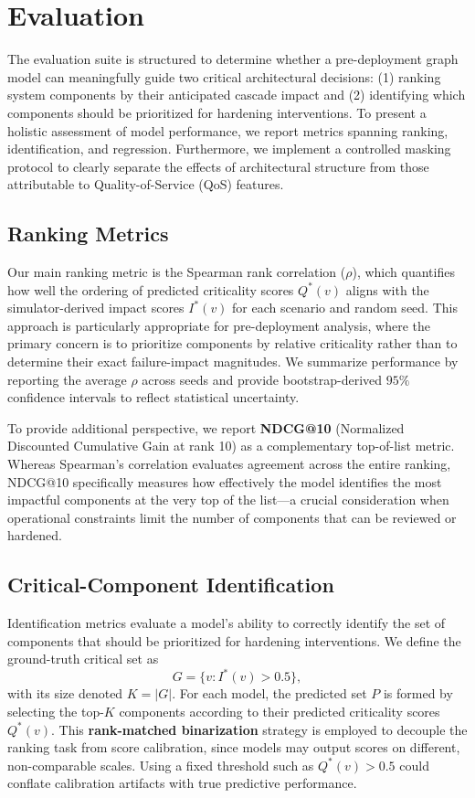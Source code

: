 \documentclass[sigconf,9pt,anonymous]{acmart}
\begin{document}
\section{Evaluation}

The evaluation suite is structured to determine whether a pre-deployment graph model can meaningfully guide two critical architectural decisions: (1) ranking system components by their anticipated cascade impact and (2) identifying which components should be prioritized for hardening interventions. To present a holistic assessment of model performance, we report metrics spanning ranking, identification, and regression. Furthermore, we implement a controlled masking protocol to clearly separate the effects of architectural structure from those attributable to Quality-of-Service (QoS) features.

\subsection{Ranking Metrics}

Our main ranking metric is the Spearman rank correlation ($\rho$), which quantifies how well the ordering of predicted criticality scores $Q^*(v)$ aligns with the simulator-derived impact scores $I^*(v)$ for each scenario and random seed. This approach is particularly appropriate for pre-deployment analysis, where the primary concern is to prioritize components by relative criticality rather than to determine their exact failure-impact magnitudes. We summarize performance by reporting the average $\rho$ across seeds and provide bootstrap-derived $95\%$ confidence intervals to reflect statistical uncertainty.

To provide additional perspective, we report \textbf{NDCG@10} (Normalized Discounted Cumulative Gain at rank 10) as a complementary top-of-list metric. Whereas Spearman's correlation evaluates agreement across the entire ranking, NDCG@10 specifically measures how effectively the model identifies the most impactful components at the very top of the list—a crucial consideration when operational constraints limit the number of components that can be reviewed or hardened.

\subsection{Critical-Component Identification}

Identification metrics evaluate a model’s ability to correctly identify the set of components that should be prioritized for hardening interventions. We define the ground-truth critical set as
\[
G = \{v : I^*(v) > 0.5\},
\]
with its size denoted $K=|G|$. For each model, the predicted set $P$ is formed by selecting the top-$K$ components according to their predicted criticality scores $Q^*(v)$. This \textbf{rank-matched binarization} strategy is employed to decouple the ranking task from score calibration, since models may output scores on different, non-comparable scales. Using a fixed threshold such as $Q^*(v)>0.5$ could conflate calibration artifacts with true predictive performance.
\end{document}
